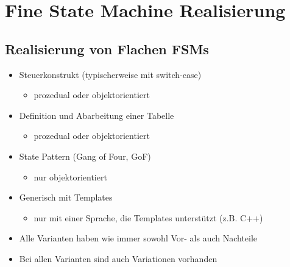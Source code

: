 \section{Fine State Machine Realisierung}

\subsection{Realisierung von Flachen FSMs}
\begin{itemize}
  \item Steuerkonstrukt (typischerweise mit switch-case)
  \begin{itemize}
    \item prozedual oder objektorientiert
   \end{itemize}
   \item Definition und Abarbeitung einer Tabelle
  \begin{itemize}
    \item prozedual oder objektorientiert
   \end{itemize}
   \item State Pattern (Gang of Four, GoF)
  \begin{itemize}
    \item nur objektorientiert
   \end{itemize}
   \item Generisch mit Templates
  \begin{itemize}
    \item nur mit einer Sprache, die Templates unterstützt (z.B. C++)
   \end{itemize}
   \item Alle Varianten haben wie immer sowohl Vor- als auch Nachteile
   \item Bei allen Varianten sind auch Variationen vorhanden
\end{itemize}




